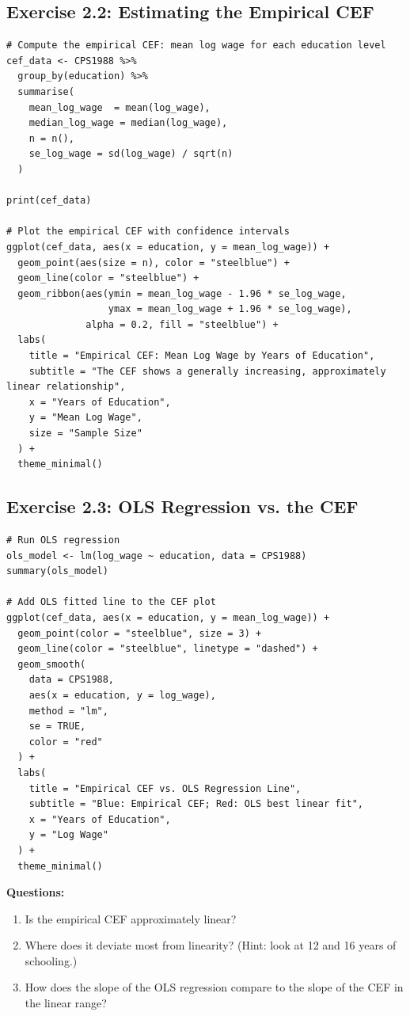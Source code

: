 \subsection{Exercise 2.2: Estimating the Empirical CEF}

\begin{lstlisting}
# Compute the empirical CEF: mean log wage for each education level
cef_data <- CPS1988 %>%
  group_by(education) %>%
  summarise(
    mean_log_wage  = mean(log_wage),
    median_log_wage = median(log_wage),
    n = n(),
    se_log_wage = sd(log_wage) / sqrt(n)
  )

print(cef_data)

# Plot the empirical CEF with confidence intervals
ggplot(cef_data, aes(x = education, y = mean_log_wage)) +
  geom_point(aes(size = n), color = "steelblue") +
  geom_line(color = "steelblue") +
  geom_ribbon(aes(ymin = mean_log_wage - 1.96 * se_log_wage,
                  ymax = mean_log_wage + 1.96 * se_log_wage),
              alpha = 0.2, fill = "steelblue") +
  labs(
    title = "Empirical CEF: Mean Log Wage by Years of Education",
    subtitle = "The CEF shows a generally increasing, approximately linear relationship",
    x = "Years of Education",
    y = "Mean Log Wage",
    size = "Sample Size"
  ) +
  theme_minimal()
\end{lstlisting}

\subsection{Exercise 2.3: OLS Regression vs. the CEF}

\begin{lstlisting}
# Run OLS regression
ols_model <- lm(log_wage ~ education, data = CPS1988)
summary(ols_model)

# Add OLS fitted line to the CEF plot
ggplot(cef_data, aes(x = education, y = mean_log_wage)) +
  geom_point(color = "steelblue", size = 3) +
  geom_line(color = "steelblue", linetype = "dashed") +
  geom_smooth(
    data = CPS1988,
    aes(x = education, y = log_wage),
    method = "lm",
    se = TRUE,
    color = "red"
  ) +
  labs(
    title = "Empirical CEF vs. OLS Regression Line",
    subtitle = "Blue: Empirical CEF; Red: OLS best linear fit",
    x = "Years of Education",
    y = "Log Wage"
  ) +
  theme_minimal()
\end{lstlisting}

\textbf{Questions:}
\begin{enumerate}
\item Is the empirical CEF approximately linear?
\item Where does it deviate most from linearity? (Hint: look at 12 and 16 years of schooling.)
\item How does the slope of the OLS regression compare to the slope of the CEF in the linear range?
\end{enumerate}


